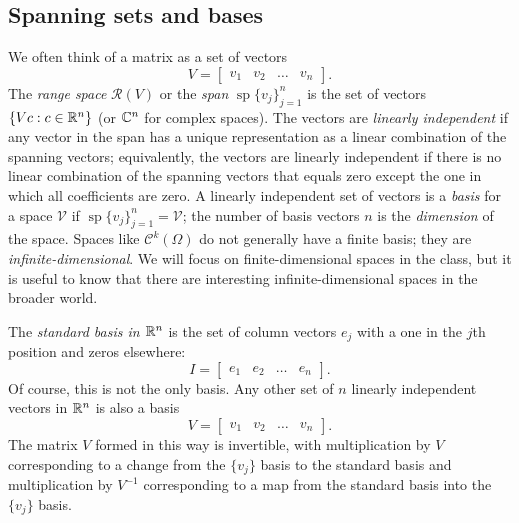 \documentclass[12pt, leqno]{article} %
\begin{document}
\subsection{Spanning sets and bases}

We often think of a matrix as a set of vectors
\[
  V = \begin{bmatrix} v_1 & v_2 & \ldots & v_n \end{bmatrix}.
\]
The {\em range space} $\mathcal{R}(V)$ or the {\em span}
$\operatorname{sp}\{ v_j \}_{j=1}^n$ is the set of vectors
$\{ V c : c \in \mathbb{R}^n \}$ (or $\mathbb{C}^n$
for complex spaces).  The vectors are {\em linearly independent}
if any vector in the span has a unique representation as a linear
combination of the spanning vectors; equivalently, the vectors are
linearly independent if there is no linear combination of the
spanning vectors that equals zero except the one in which all
coefficients are zero.  A linearly independent set of vectors is
a {\em basis} for a space $\mathcal{V}$ if
$\operatorname{sp}\{v_j\}_{j=1}^n = \mathcal{V}$; the number of
basis vectors $n$ is the {\em dimension} of the space.  Spaces
like $\mathcal{C}^k(\Omega)$ do not generally have a finite basis;
they are {\em infinite-dimensional}.  We will focus on
finite-dimensional spaces in the class, but it is useful to know
that there are interesting infinite-dimensional spaces in the
broader world.

The {\em standard basis in $\mathbb{R}^n$} is the set of column vectors
$e_j$ with a one in the $j$th position and zeros elsewhere:
\[
  I = \begin{bmatrix} e_1 & e_2 & \ldots & e_n \end{bmatrix}.
\]
Of course, this is not the only basis.  Any other set of $n$ linearly
independent vectors in $\mathbb{R}^n$ is also a basis
\[
  V = \begin{bmatrix} v_1 & v_2 & \ldots & v_n \end{bmatrix}.
\]
The matrix $V$ formed in this way is invertible, with multiplication by $V$
corresponding to a change from the $\{v_j\}$ basis to the standard basis and
multiplication by $V^{-1}$ corresponding to a map from the standard basis 
into the $\{v_j\}$ basis.
\end{document}
